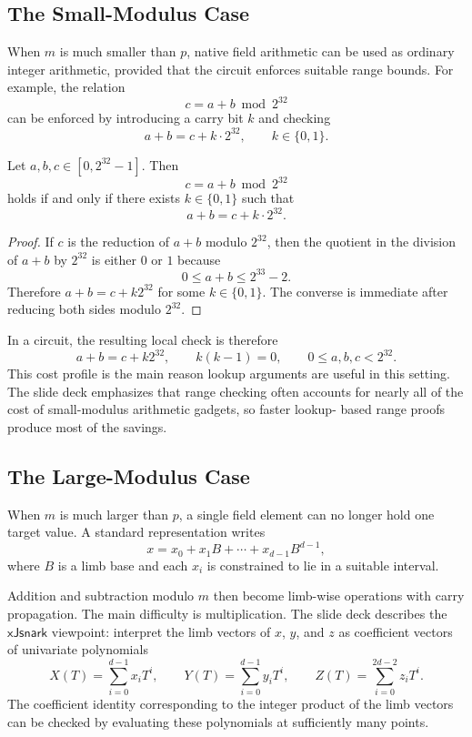 \documentclass[11pt]{article}
\newcommand{\XJsnark}{\ensuremath{\mathsf{xJsnark}}}
\begin{document}
\subsection{The Small-Modulus Case}

When $m$ is much smaller than $p$, native field arithmetic can be used as
ordinary integer arithmetic, provided that the circuit enforces suitable range
bounds.  For example, the relation
\[
  c = a + b \bmod 2^{32}
\]
can be enforced by introducing a carry bit $k$ and checking
\[
  a + b = c + k \cdot 2^{32},
  \qquad
  k \in \{0,1\}.
\]

\begin{proposition}
Let $a,b,c \in [0,2^{32}-1]$.  Then
\[
  c = a + b \bmod 2^{32}
\]
holds if and only if there exists $k \in \{0,1\}$ such that
\[
  a + b = c + k \cdot 2^{32}.
\]
\end{proposition}

\begin{proof}
If $c$ is the reduction of $a+b$ modulo $2^{32}$, then the quotient in the
division of $a+b$ by $2^{32}$ is either $0$ or $1$ because
\[
  0 \leq a+b \leq 2^{33}-2.
\]
Therefore $a+b = c + k 2^{32}$ for some $k \in \{0,1\}$.  The converse is
immediate after reducing both sides modulo $2^{32}$.
\end{proof}

In a circuit, the resulting local check is therefore
\[
  a+b=c+k2^{32},
  \qquad
  k(k-1)=0,
  \qquad
  0 \leq a,b,c < 2^{32}.
\]
This cost profile is the main reason lookup arguments are useful in this
setting.  The slide deck emphasizes that range checking often accounts for
nearly all of the cost of small-modulus arithmetic gadgets, so faster lookup-
based range proofs produce most of the savings.

\subsection{The Large-Modulus Case}

When $m$ is much larger than $p$, a single field element can no longer hold one
target value.  A standard representation writes
\[
  x = x_0 + x_1 B + \cdots + x_{d-1} B^{d-1},
\]
where $B$ is a limb base and each $x_i$ is constrained to lie in a suitable
interval.

Addition and subtraction modulo $m$ then become limb-wise operations with
carry propagation.  The main difficulty is multiplication.  The slide deck
describes the \XJsnark{} viewpoint: interpret the limb vectors of $x$, $y$, and
$z$ as coefficient vectors of univariate polynomials
\[
  X(T) = \sum_{i=0}^{d-1} x_i T^i,
  \qquad
  Y(T) = \sum_{i=0}^{d-1} y_i T^i,
  \qquad
  Z(T) = \sum_{i=0}^{2d-2} z_i T^i.
\]
The coefficient identity corresponding to the integer product of the limb
vectors can be checked by evaluating these polynomials at sufficiently many
points.
\end{document}
